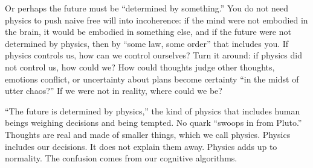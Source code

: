 Or perhaps the future must be ``determined by something.'' You do not need physics to push naive free will into incoherence: if the mind were not embodied in the brain, it would be embodied in something else, and if the future were not determined by physics, then by ``some law, some order'' that includes you. If physics controls us, how can we control ourselves? Turn it around: if physics did not control us, how could we?  How could thoughts judge other thoughts, emotions conflict, or uncertainty about plans become certainty ``in the midst of utter chaos?'' If we were not in reality, where could we be? 

``The future is determined by physics,'' the kind of physics that includes human beings weighing decisions and being tempted. No quark ``swoops in from Pluto.'' Thoughts are real and made of smaller things, which we call physics. Physics includes our decisions. It does not explain them away.  Physics adds up to normality. The confusion comes from our cognitive algorithms.
